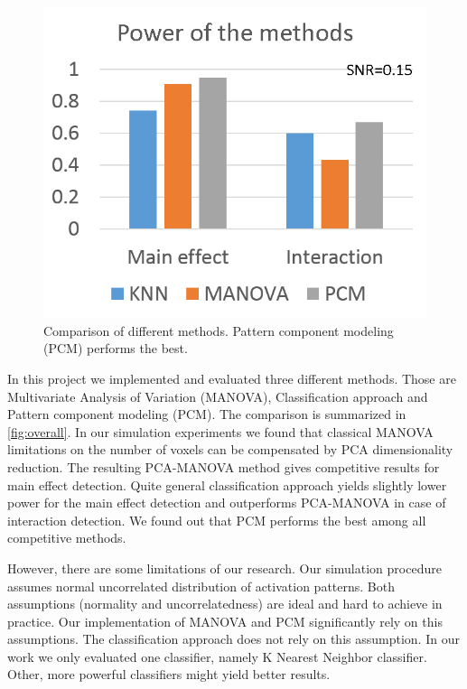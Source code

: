 \documentclass[paper=a4,fontsize=12pt]{scrartcl}
\numberwithin{equation}{section} %
\numberwithin{figure}{section} %
\numberwithin{table}{section} %
\begin{document}
\begin{figure}[t]
\centering
\includegraphics{overall.png}
\caption{Comparison of different methods. Pattern component modeling (PCM) performs the best.}
\label{fig:overall}
\end{figure}

In this project we implemented and evaluated three different methods. Those are Multivariate Analysis of Variation (MANOVA), Classification approach and Pattern component modeling (PCM). The comparison is summarized in \autoref{fig:overall}. In our simulation experiments we found that classical MANOVA limitations on the number of voxels can be compensated by PCA dimensionality reduction. The resulting PCA-MANOVA method gives competitive results for main effect detection. Quite general classification approach yields slightly lower power for the main effect detection and outperforms PCA-MANOVA in case of interaction detection. We found out that PCM performs the best among all competitive methods.

However, there are some limitations of our research. Our simulation procedure assumes normal uncorrelated distribution of activation patterns. Both assumptions (normality and uncorrelatedness) are ideal and hard to achieve in practice. Our implementation of MANOVA and PCM significantly rely on this assumptions. The classification approach does not rely on this assumption. In our work we only evaluated one classifier, namely K Nearest Neighbor classifier. Other, more powerful classifiers might yield better results.

\FloatBarrier



\end{document}
